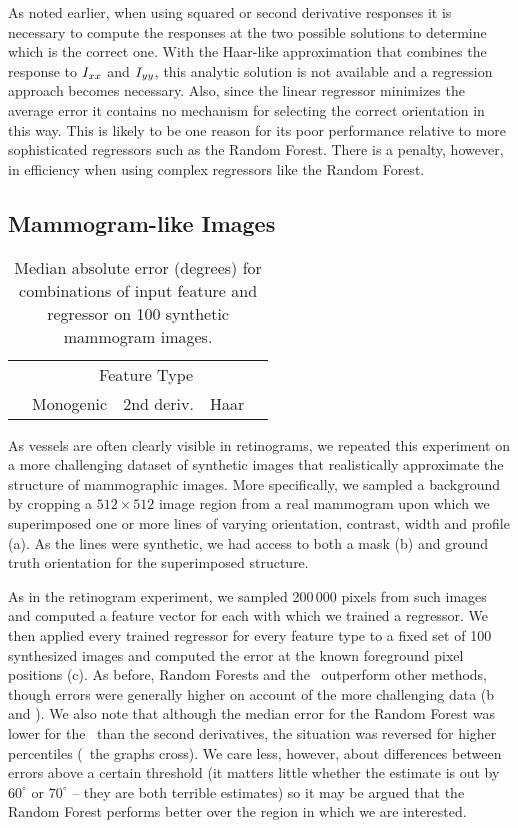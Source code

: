 As noted earlier, when using squared or second derivative responses it is necessary to compute the responses at the two possible solutions to determine which is the correct one. With the Haar-like approximation that combines the response to $I_{xx}$ and $I_{yy}$, this analytic solution is not available and a regression approach becomes necessary. Also, since the linear regressor minimizes the average error it contains no mechanism for selecting the correct orientation in this way. This is likely to be one reason for its poor performance relative to more sophisticated regressors such as the Random Forest. There is a penalty, however, in efficiency when using complex regressors like the Random Forest.


\subsection{Mammogram-like Images}
\label{s:expts_synth_mammography}
\begin{table}[t]
\centering
\begin{tabular}{l|c c c c}
							& \multicolumn{4}{c}{Feature Type} \\
							& Monogenic		& 2nd deriv.	& Haar				& \dtcwt \\
\hline

\end{tabular}
%
\caption{Median absolute error (degrees) for combinations of input feature and regressor on 100 synthetic mammogram images.}
\label{t:synth_mammography}
\end{table}

As vessels are often clearly visible in retinograms, we repeated this experiment on a more challenging dataset of synthetic images that realistically approximate the structure of mammographic images. More specifically, we sampled a background by cropping a $512{\times}512$ image region from a real mammogram upon which we superimposed one or more lines of varying orientation, contrast, width and profile (a). As the lines were synthetic, we had access to both a mask (b) and ground truth orientation for the superimposed structure.

As in the retinogram experiment, we sampled 200\,000 pixels from such images and computed a feature vector for each with which we trained a regressor. We then applied every trained regressor for every feature type to a fixed set of 100 synthesized images and computed the error at the known foreground pixel positions (c). As before, Random Forests and the \dtcwt~outperform other methods, though errors were generally higher on account of the more challenging data (b and ). We also note that although the median error for the Random Forest was lower for the \dtcwt~than the second derivatives, the situation was reversed for higher percentiles (\ie~the graphs cross). We care less, however, about differences between errors above a certain threshold (it matters little whether the estimate is out by $60^\circ$ or $70^\circ$ -- they are both terrible estimates) so it may be argued that the Random Forest performs better over the region in which we are interested.

